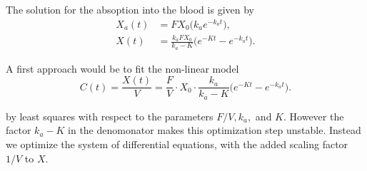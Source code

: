 \documentclass{homework}
\begin{document}
The solution for the absoption into the blood is given by 
\begin{align*}
X_a(t) &= FX_0 \big( k_ae^{-k_at} \big),\\ 
X(t) &= \frac{k_a F X_0}{k_a - K}\big( e^{-Kt} - e^{-k_a t}\big).
\end{align*}

A first approach would be to fit the non-linear model
$$C(t) = \frac{X(t)}{V} = \frac{F}{V} \cdot X_0 \cdot \frac{k_a}{k_a -K}\big( e^{-Kt} - e^{-k_a t}\big).$$

by least squares with respect to the parameters $F/V,k_a,$ and $K$.  However the factor $k_a - K$ in the denomonator makes this optimization step unstable.  Instead we optimize the system of differential equations, with the added scaling factor $1 / V$ to $X$.
\end{document}
